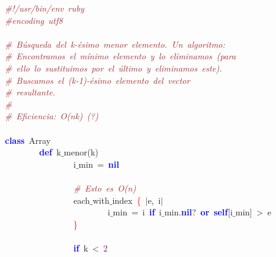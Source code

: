 \noindent
\mbox{}\textit{\textcolor{Brown}{\#!/usr/bin/env\ ruby}} \\
\mbox{}\textit{\textcolor{Brown}{\#encoding\ utf8}} \\
\mbox{} \\
\mbox{}\textit{\textcolor{Brown}{\#\ Búsqueda\ del\ k-ésimo\ menor\ elemento.\ Un\ algoritmo:}} \\
\mbox{}\textit{\textcolor{Brown}{\#\ Encontramos\ el\ mínimo\ elemento\ y\ lo\ eliminamos\ (para}} \\
\mbox{}\textit{\textcolor{Brown}{\#\ ello\ lo\ sustituimos\ por\ el\ último\ y\ eliminamos\ este).}} \\
\mbox{}\textit{\textcolor{Brown}{\#\ Buscamos\ el\ (k-1)-ésimo\ elemento\ del\ vector}} \\
\mbox{}\textit{\textcolor{Brown}{\#\ resultante.}} \\
\mbox{}\textit{\textcolor{Brown}{\#}} \\
\mbox{}\textit{\textcolor{Brown}{\#\ Eficiencia:\ O(nk)\ (?)}} \\
\mbox{} \\
\mbox{}\textbf{\textcolor{Blue}{class}}\ Array \\
\mbox{}\ \ \ \ \ \ \ \ \textbf{\textcolor{Blue}{def}}\ k$\_$menor\textcolor{BrickRed}{(}k\textcolor{BrickRed}{)} \\
\mbox{}\ \ \ \ \ \ \ \ \ \ \ \ \ \ \ \ i$\_$min\ \textcolor{BrickRed}{=}\ \textbf{\textcolor{Blue}{nil}} \\
\mbox{} \\
\mbox{}\ \ \ \ \ \ \ \ \ \ \ \ \ \ \ \ \textit{\textcolor{Brown}{\#\ Esto\ es\ O(n)}} \\
\mbox{}\ \ \ \ \ \ \ \ \ \ \ \ \ \ \ \ each$\_$with$\_$index\ \textcolor{Red}{\{}\ \textcolor{BrickRed}{$|$}e\textcolor{BrickRed}{,}\ i\textcolor{BrickRed}{$|$} \\
\mbox{}\ \ \ \ \ \ \ \ \ \ \ \ \ \ \ \ \ \ \ \ \ \ \ \ i$\_$min\ \textcolor{BrickRed}{=}\ i\ \textbf{\textcolor{Blue}{if}}\ i$\_$min\textcolor{BrickRed}{.}\textbf{\textcolor{Blue}{nil}}\textcolor{BrickRed}{?}\ \textbf{\textcolor{Blue}{or}}\ \textbf{\textcolor{Blue}{self}}\textcolor{BrickRed}{[}i$\_$min\textcolor{BrickRed}{]}\ \textcolor{BrickRed}{\textgreater{}}\ e \\
\mbox{}\ \ \ \ \ \ \ \ \ \ \ \ \ \ \ \ \textcolor{Red}{\}} \\
\mbox{} \\
\mbox{}\ \ \ \ \ \ \ \ \ \ \ \ \ \ \ \ \textbf{\textcolor{Blue}{if}}\ k\ \textcolor{BrickRed}{\textless{}}\ \textcolor{Purple}{2} \\
